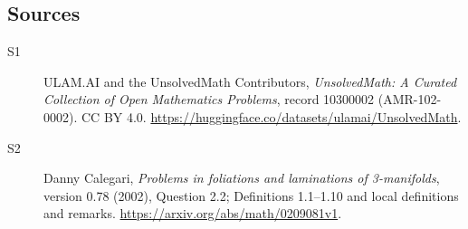 \documentclass[11pt]{article}
\begin{document}
\subsection{Sources}
\begin{description}
\item[\hypertarget{source:10300002:1}{S1}] ULAM.AI and the UnsolvedMath Contributors, \emph{UnsolvedMath: A Curated Collection of Open Mathematics Problems}, record 10300002 (AMR-102-0002). CC BY 4.0. \url{https://huggingface.co/datasets/ulamai/UnsolvedMath}.
\item[\hypertarget{source:10300002:2}{S2}] Danny Calegari, \emph{Problems in foliations and laminations of 3-manifolds}, version 0.78 (2002), Question 2.2; Definitions 1.1--1.10 and local definitions and remarks. \url{https://arxiv.org/abs/math/0209081v1}.
\end{description}
\label{end:10300002}
\end{document}
